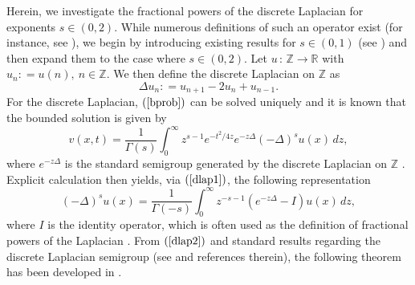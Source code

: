 \documentclass[final,1p,times]{elsarticle}
\def\ZZ{\mathbb Z} %
\def\RR{\mathbb R} %
\def\l{\left}
\def\r{\right}
\newcommand{\bb}[1]{\begin{equation}\label{#1}}
\newcommand{\ee}{\end{equation}}
\def\R#1{$(\ref{#1})$}
\theoremstyle{remark}
\theoremstyle{definition}
\begin{document}
Herein, we investigate the fractional powers of the discrete Laplacian for exponents $s\in(0,2).$ 
While numerous definitions of such an operator exist (for instance, see \cite{kwasnicki2017ten}), we begin by introducing existing results for $s\in(0,1)$ (see \cite{ciaurri2016nonlocal,ciaurri2015fractional}) and then expand them to the case where $s\in(0,2).$
Let $u\,:\,\ZZ\to\RR$ with $u_n\mathrel{\mathop:}= u(n),\ n\in\ZZ.$ We then define the discrete Laplacian on $\ZZ$ as
\bb{dlap}
\Delta u_n \mathrel{\mathop:}= u_{n+1}-2u_n+u_{n-1}.
\ee
For the discrete Laplacian, \R{bprob} can be solved uniquely and it is known that the bounded solution is given by
\bb{extsol}
v(x,t) = \frac{1}{\Gamma(s)}\int_0^\infty z^{s-1}e^{-t^2/4z}e^{-z\Delta}(-\Delta)^su(x)\,dz,
\ee
where $e^{-z\Delta}$ is the standard semigroup generated by the discrete Laplacian on $\ZZ$ \cite{ciaurri2016nonlocal,meichsner2017fractional,doi:10.1080/03605301003735680,Gale2013}. Explicit calculation then yields, via \R{dlap1}, the following representation
\bb{dlap2}
(-\Delta)^s u(x) = \frac{1}{\Gamma(-s)}\int_0^\infty z^{-s-1}\l(e^{-z\Delta}-I\r)u(x)\,dz,
\ee
where $I$ is the identity operator,
which is often used as the definition of fractional powers of the Laplacian \cite{ciaurri2016nonlocal,ciaurri2015fractional}. From \R{dlap2} and standard results regarding the discrete Laplacian semigroup (see \cite{Ciaurri2017} and references therein), the following theorem has been developed in \cite{ciaurri2015fractional}. 
\end{document}
